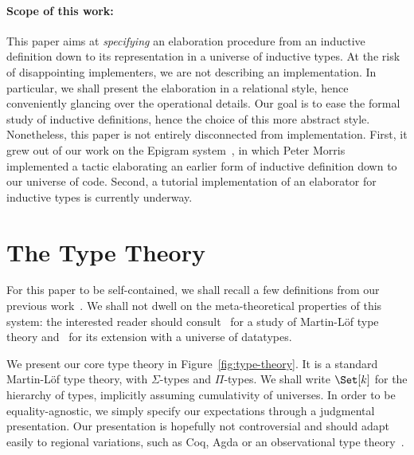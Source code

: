 \documentclass{scrartcl}
\theoremstyle{plain}
\theoremstyle{definition}
\begin{document}
\paragraph{Scope of this work:} 

This paper aims at \emph{specifying} an elaboration procedure from an
inductive definition down to its representation in a universe of
inductive types. At the risk of disappointing implementers, we are
not describing an implementation. In particular, we shall present the
elaboration in a relational style, hence conveniently glancing over
the operational details. Our goal is to ease the formal study of
inductive definitions, hence the choice of this more abstract style.
Nonetheless, this paper is not entirely disconnected from
implementation. First, it grew out of our work on the Epigram
system~\citep{pigs:epigram}, in which Peter Morris implemented a
tactic elaborating an earlier form of inductive definition down to our
universe of code. Second, a tutorial implementation of an elaborator
for inductive types is currently underway.



\section{The Type Theory}
\label{sec:type-theory}



For this paper to be self-contained, we shall recall a few definitions
from our previous work~\citep{dagand:levitation}. We shall not dwell
on the meta-theoretical properties of this system: the interested
reader should consult~\citet{luo:utt} for a study of Martin-L\"{o}f
type theory and~\citet{dagand:levitation} for its extension with a
universe of datatypes.



We present our core type theory in Figure~\ref{fig:type-theory}. It is
a standard Martin-L\"{o}f type theory, with \(\Sigma\)-types and
\(\Pi\)-types. We shall write \(\Set[k]\) for the hierarchy of types,
implicitly assuming cumulativity of universes. In order to be
equality-agnostic, we simply specify our expectations through a
judgmental presentation. Our presentation is hopefully not
controversial and should adapt easily to regional variations, such as
Coq, Agda or an observational type theory~\citep{altenkirch:ott}.
\end{document}
